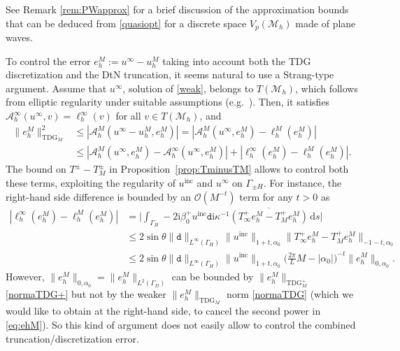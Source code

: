 \documentclass[a4paper,10pt]{article}
\newcommand{\ri}{{\mathrm i}}
\newcommand{\rd}{{\,\mathrm d}}
\newcommand{\inc}{{\mathrm{inc}}}
\newcommand{\Mh}{{\mathcal M_h}}
\newcommand{\cA}{{\mathcal A}}
\newcommand{\pd}{{\mathtt{d}}}
\newcommand{\GD}{{\Gamma_D}}
\newcommand{\GH}{{\Gamma_H}}
\newcommand{\GpmH}{{\Gamma_{\pm H}}}
\begin{document}
See Remark \ref{rem:PWapprox} for a brief discussion of the approximation bounds that can be deduced from \eqref{quasiopt} for a discrete space $V_p(\Mh)$ made of plane waves.

\begin{rem}
To control the error $e_h^M:=u^\infty-u_h^M$ taking into account both the TDG discretization and the DtN truncation, it seems natural to use a Strang-type argument.
Assume that $u^\infty$, solution of \eqref{weak}, belongs to $T(\Mh)$, which follows from elliptic regularity under suitable assumptions (e.g.~\cite[Lemma~3.1]{Lechleiter2010}).
Then, it satisfies $\cA_h^\infty(u^\infty,v)=\ell_h^\infty(v)$ for all $v\in T(\Mh)$, and 
\begin{align}\nonumber
	\|e_h^M\|_{\mathrm{TDG}_M}^2
	&\le |\cA_h^M(u^\infty-u_h^M,e_h^M)|
	=|\cA_h^M(u^\infty,e_h^M)-\ell_h^M(e_h^M)|\\
	&\le |\cA_h^M(u^\infty,e_h^M)-\cA_h^\infty(u^\infty,e_h^M)|+|\ell_h^\infty(e_h^M)-\ell_h^M(e_h^M)|.
	\label{eq:ehM}
\end{align}
The bound on $T^\pm-T^\pm_M$ in Proposition~\ref{prop:TminusTM} allows to control both these terms, exploiting the regularity of $u^\inc$ and $u^\infty$ on $\GpmH$.
For instance, the right-hand side difference is bounded by an $\mathcal O(M^{-t})$ term 
for any $t>0$ as
\begin{align*}
	|\ell_h^\infty(e_h^M)-\ell_h^M(e_h^M)|
	&=\Big|\int_\GH -2\ri\beta_0^+ u^\inc \pd\ri\kappa^{-1} \overline{(T^+_\infty e_h^M-T^+_M e_h^M)}\rd s\Big|
	\\
	&\le 2\sin\theta\|\pd\|_{L^\infty(\GH)}\|u^\inc\|_{1+t,\alpha_0} \|T^+_\infty e_h^M-T^+_M e_h^M\|_{-1-t,\alpha_0}
	\\
	&\le 2\sin\theta\|\pd\|_{L^\infty(\GH)}\|u^\inc\|_{1+t,\alpha_0} \Big(\frac{2\pi}L M-|\alpha_0|\Big)^{-t} 
	\|e_h^M\|_{0,\alpha_0}.
\end{align*}
However, $\|e_h^M\|_{0,\alpha_0}=\|e_h^M\|_{L^2(\GD)}$ can be bounded by $\|e_h^M\|_{\mathrm{TDG}_M^+}$ \eqref{normaTDG+} but not by the weaker $\|e_h^M\|_{\mathrm{TDG}_M}$ norm \eqref{normaTDG} (which we would like to obtain at the right-hand side, to cancel the second power in \eqref{eq:ehM}).
So this kind of argument does not easily allow to control the combined truncation/discretization error.
\end{rem}
\end{document}
